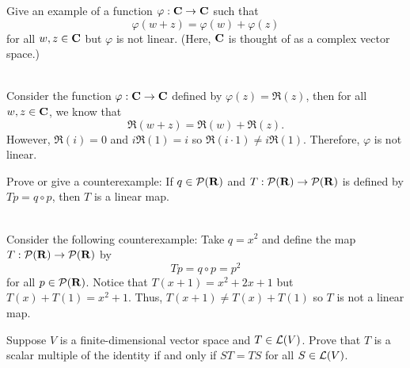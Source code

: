 \begin{exercise}
    Give an example of a function $\varphi : \mathbf{C} \to \mathbf{C}$ such that
    $$\varphi(w + z) = \varphi(w) + \varphi(z)$$
    for all $w,z \in \mathbf{C}$ but $\varphi$ is not linear. (Here, $\mathbf{C}$ is thought of as a complex vector space.)\\
\end{exercise}

\begin{solution}
    \\ Consider the function $\varphi : \mathbf{C} \to \mathbf{C}$ defined by $\varphi(z) = \Re(z)$, then for all $w,z \in \mathbf{C}$, we know that
    $$\Re(w + z) = \Re(w) + \Re(z).$$
    However, $\Re(i) = 0$ and $i \Re(1) = i$ so $\Re(i \cdot 1) \neq i\Re(1)$. Therefore, $\varphi$ is not linear. \\
\end{solution}

\begin{exercise}
    Prove or give a counterexample: If $q \in \mathcal{P}(\mathbf{R})$ and $T: \mathcal{P}(\mathbf{R}) \to \mathcal{P}(\mathbf{R})$ is defined by $Tp = q \circ p$, then $T$ is a linear map. \\
\end{exercise}

\begin{solution}
    \\ Consider the following counterexample: Take $q = x^2$ and define the map $T : \mathcal{P}(\mathbf{R}) \to \mathcal{P}(\mathbf{R})$ by 
    $$Tp = q \circ p = p^2$$
    for all $p \in \mathcal{P}(\mathbf{R})$. Notice that $T(x + 1) = x^2 + 2x + 1$ but $T(x) + T(1) = x^2 + 1$. Thus, $T(x + 1) \neq T(x) + T(1)$ so $T$ is not a linear map. \\
\end{solution}

\begin{exercise}
    Suppose $V$ is a finite-dimensional vector space and $T \in \mathcal{L}(V)$. Prove that $T$ is a scalar multiple of the identity if and only if $ST = TS$ for all $S \in \mathcal{L}(V)$. \\
\end{exercise}

